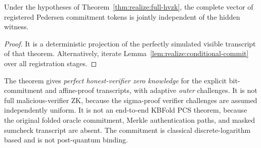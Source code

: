 \begin{corollary}\label{cor:realize:tokens}
Under the hypotheses of
Theorem~\ref{thm:realize:full-hvzk},
the complete vector of registered
Pedersen commitment tokens is jointly
independent of the hidden witness.
\end{corollary}
\begin{proof}
It is a deterministic projection
of the perfectly simulated visible
transcript of that theorem.
Alternatively, iterate
Lemma~\ref{lem:realize:conditional-commit}
over all registration stages.
\end{proof}

\begin{remark}
The theorem gives \emph{perfect honest-verifier
zero knowledge} for the explicit
bit-commitment and affine-proof transcripts,
with adaptive \emph{outer} challenges.
It is not full malicious-verifier ZK,
because the sigma-proof verifier
challenges are assumed independently
uniform. It is not an end-to-end KBFold
PCS theorem, because the original
folded oracle commitment, Merkle
authentication paths, and masked
sumcheck transcript are absent.
The commitment is classical
discrete-logarithm based and is
not post-quantum binding.
\end{remark}
